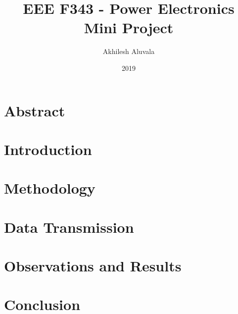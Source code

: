 \documentclass[12pt, oneside]{report}
\title{EEE F343 - Power Electronics
Mini Project
}
\author{Akhilesh Aluvala}
\date{2019}
\begin{document}
\setlength{\abovedisplayskip}{1pt}
\setlength{\belowdisplayskip}{1pt}


\chapter*{Abstract}


\cleardoublepage


\thispagestyle{empty}

\chapter{Introduction}


\chapter{Methodology}


\chapter{Data Transmission}



\chapter{Observations and Results}



\chapter{Conclusion}



% 
%

%
\end{document}
